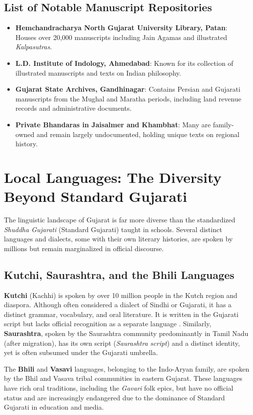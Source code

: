 \documentclass[12pt]{article}
\begin{document}
\subsection{List of Notable Manuscript Repositories}
\begin{itemize}[leftmargin=*]
    \item \textbf{Hemchandracharya North Gujarat University Library, Patan}: Houses over 20,000 manuscripts including Jain Agamas and illustrated \textit{Kalpasutras}.
    \item \textbf{L.D. Institute of Indology, Ahmedabad}: Known for its collection of illustrated manuscripts and texts on Indian philosophy.
    \item \textbf{Gujarat State Archives, Gandhinagar}: Contains Persian and Gujarati manuscripts from the Mughal and Maratha periods, including land revenue records and administrative documents.
    \item \textbf{Private Bhandaras in Jaisalmer and Khambhat}: Many are family-owned and remain largely undocumented, holding unique texts on regional history.
\end{itemize}

\section{Local Languages: The Diversity Beyond Standard Gujarati}
The linguistic landscape of Gujarat is far more diverse than the standardized \textit{Shuddha Gujarati} (Standard Gujarati) taught in schools. Several distinct languages and dialects, some with their own literary histories, are spoken by millions but remain marginalized in official discourse.

\subsection{Kutchi, Saurashtra, and the Bhili Languages}
\textbf{Kutchi} (Kachhi) is spoken by over 10 million people in the Kutch region and diaspora. Although often considered a dialect of Sindhi or Gujarati, it has a distinct grammar, vocabulary, and oral literature. It is written in the Gujarati script but lacks official recognition as a separate language \cite{patel2015}. Similarly, \textbf{Saurashtra}, spoken by the Saurashtra community predominantly in Tamil Nadu (after migration), has its own script (\textit{Saurashtra script}) and a distinct identity, yet is often subsumed under the Gujarati umbrella.

The \textbf{Bhili} and \textbf{Vasavi} languages, belonging to the Indo-Aryan family, are spoken by the Bhil and Vasava tribal communities in eastern Gujarat. These languages have rich oral traditions, including the \textit{Gavari} folk epics, but have no official status and are increasingly endangered due to the dominance of Standard Gujarati in education and media.
\end{document}
